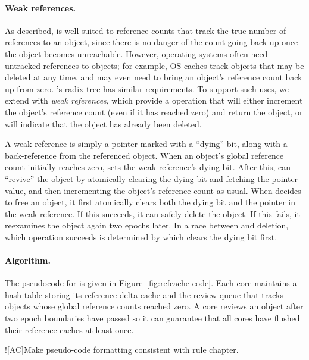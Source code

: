 \paragraph{Weak references.}
As described,  is well suited to reference counts that track
the true number of references to an object, since there is no danger
of the count going back up once the object becomes unreachable.
However, operating systems often need untracked references to objects;
for example, OS caches track objects that may be deleted at any time,
and may even need to bring an object's reference count back up from
zero.  \vm's radix tree has similar requirements.  To support such
uses, we extend  with \emph{weak references}, which provide a
 operation that will either increment the object's
reference count (even if it has reached zero) and return the object,
or will indicate that the object has already been deleted.

A weak reference is simply a pointer marked with a ``dying'' bit,
along with a back-reference from the referenced object.  When an
object's global reference count initially reaches zero,  sets
the weak reference's dying bit.  After this,  can
``revive'' the object by atomically clearing the dying bit and
fetching the pointer value, and then incrementing the object's
reference count as usual.  When  decides to free an object,
it first atomically clears both the dying bit and the pointer in the
weak reference.  If this succeeds, it can safely delete the object.
If this fails, it reexamines the object again two epochs later.  In a
race between  and deletion, which operation succeeds is determined
by which clears the dying bit first.

\paragraph{Algorithm.}
The pseudocode for  is given in
Figure~\ref{fig:refcache-code}.  Each core maintains a hash table
storing its reference delta cache and the review queue that tracks
objects whose global reference counts reached zero.  A core reviews an
object after two epoch boundaries have passed so it can guarantee
that all cores have flushed their
reference caches at least once.

\XXX![AC]{Make pseudo-code formatting consistent with rule chapter.}

